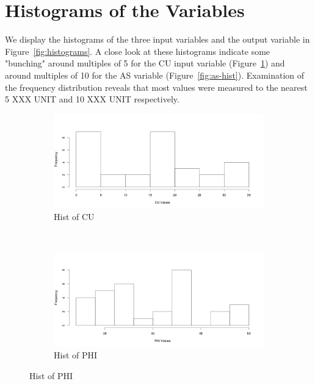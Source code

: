 \documentclass[a4paper,12pt, english]{article}
\begin{document}
\section{Histograms of the Variables}
We display the histograms of the three input variables and the output variable in Figure~\ref{fig:histograms}. A close look at these histograms indicate some "bunching" around multiples of 5 for the CU input variable (Figure~\ref{fig:cu-hist}) and around multiples of 10 for the AS variable (Figure~\ref{fig:as-hist}). Examination of the frequency distribution reveals that most values were measured to the nearest 5 XXX UNIT and 10 XXX UNIT respectively.
\begin{figure}[H]
        \centering
        \begin{subfigure}[b]{0.45\textwidth}
                \includegraphics[width=\textwidth]{cu-hist}
                \caption{Hist of CU}
                \label{fig:cu-hist}
        \end{subfigure}%
        ~ %
        \begin{subfigure}[b]{0.45\textwidth}
                \includegraphics[width=\textwidth]{phi-hist}
                \caption{Hist of PHI}
                \label{fig:phi-hist}
        \end{subfigure}

\end{figure}
\end{document}
